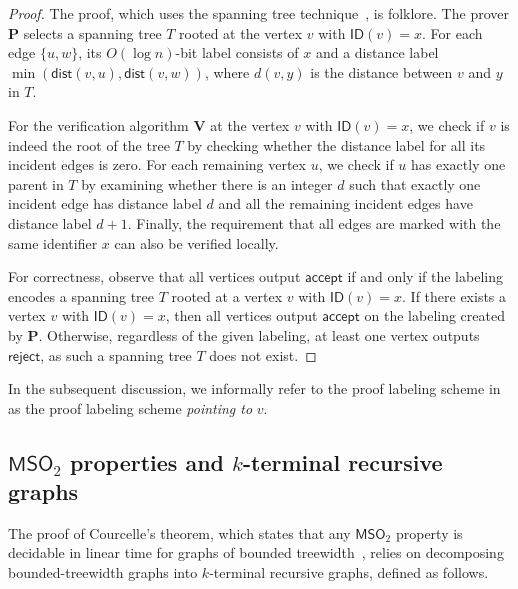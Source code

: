 \documentclass[11pt]{article}
\theoremstyle{definition}
\theoremstyle{remark}
\newcommand{\dist}{\mathsf{dist}}
\newcommand{\acc}{\mathsf{accept}}
\newcommand{\rej}{\mathsf{reject}}
\newcommand{\MSO}{\mathsf{MSO}_2}
\newcommand{\ID}{\mathsf{ID}}
\begin{document}
\begin{proof}
The proof, which uses the spanning tree technique~\cite{afek1991memory}, is folklore. The prover $\mathbf{P}$ selects a spanning tree $T$ rooted at the vertex $v$ with $\ID(v) = x$. For each edge $\{u,w\}$, its $O(\log n)$-bit label consists of $x$ and a distance label $\min(\dist(v,u), \dist(v,w))$, where $d(v,y)$ is the distance between $v$ and $y$ in $T$.

For the verification algorithm $\mathbf{V}$ at the vertex $v$ with $\ID(v) = x$, we check if $v$ is indeed the root of the tree $T$ by checking whether the distance label for all its incident edges is zero. For each remaining vertex $u$, we check if $u$ has exactly one parent in $T$ by examining whether there is an integer $d$ such that exactly one incident edge has distance label $d$ and all the remaining incident edges have distance label $d+1$. Finally, the requirement that all edges are marked with the same identifier $x$ can also be verified locally.

For correctness, observe that all vertices output $\acc$ if and only if the labeling encodes a spanning tree $T$ rooted at a vertex $v$ with $\ID(v) = x$. If there exists a vertex $v$ with $\ID(v) = x$, then all vertices output $\acc$ on the labeling created by $\mathbf{P}$. Otherwise, regardless of the given labeling, at least one vertex outputs $\rej$, as such a spanning tree $T$ does not exist.
\end{proof}


In the subsequent discussion, we informally refer to the proof labeling scheme in  as the proof labeling scheme \emph{pointing to} $v$. %

\subsection{\texorpdfstring{$\MSO$}{MSO2} properties and \texorpdfstring{$k$}{k}-terminal recursive graphs}

The proof of Courcelle's theorem, which states that any $\MSO$ property is decidable in linear time for graphs of bounded treewidth~\cite{borie1992automatic,COURCELLE199012}, relies on decomposing bounded-treewidth graphs into $k$-terminal recursive graphs, defined as follows.
\end{document}
